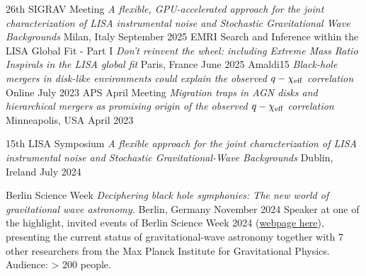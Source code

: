 

\begin{cventries}

\cventry
{26th SIGRAV Meeting}
{\emph{A flexible, GPU-accelerated approach for the joint characterization of LISA instrumental noise and Stochastic Gravitational Wave Backgrounds}}
{Milan, Italy}
{September 2025}
{}
\cventry
{EMRI Search and Inference within the LISA Global Fit - Part I}
{\emph{Don’t reinvent the wheel: including Extreme Mass Ratio Inspirals in the LISA global fit}}
{Paris, France}
{June 2025}
{}
\cventry
{Amaldi15}
{\emph{Black-hole mergers in disk-like environments could explain the observed $q-\chi_{\rm eff}$ correlation}}
{Online}
{July 2023}
{}
\cventry
{APS April Meeting}
{\emph{Migration traps in AGN disks and hierarchical mergers as promising origin of the observed $q-\chi_{\rm eff}$ correlation}}
{Minneapolis, USA}
{April 2023}
{}
\end{cventries}


\begin{cventries}

\cventry
{15th LISA Symposium}
{\emph{A flexible approach for the joint characterization of LISA instrumental noise and Stochastic Gravitational-Wave Backgrounds}}
{Dublin, Ireland}
{July 2024}
{}
%
\end{cventries}


\begin{cventries}

\cventry
{Berlin Science Week}
{\emph{Deciphering black hole symphonies: The new world of gravitational wave astronomy.}}
{Berlin, Germany}
{November 2024}
{Speaker at one of the highlight, invited events of Berlin Science Week 2024 (\href{https://berlinscienceweek.com/programme/deciphering-black-hole-symphonies-new-world-gravitational-wave-astronomy}{webpage here}), presenting the current status of gravitational-wave astronomy together with 7 other researchers from the Max Planck Institute for Gravitational Physics. Audience: > 200 people.}
%
\end{cventries}
